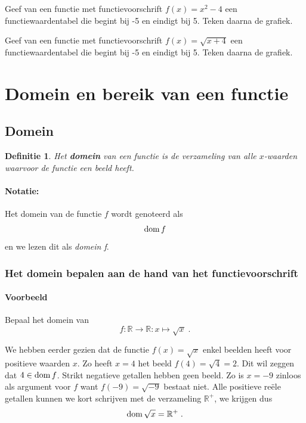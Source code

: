 \documentclass[12pt,twoside]{article}
\newtheorem{definition}{Definitie}
\begin{document}
\begin{oefening}
  Geef van een functie met functievoorschrift $f(x)=x^2-4$ een functiewaardentabel die begint bij -5 en eindigt bij 5. Teken daarna de grafiek.
\end{oefening}

\begin{oefening}
  Geef van een functie met functievoorschrift $f(x)=\sqrt{x+4}$ een functiewaardentabel die begint bij -5 en eindigt bij 5. Teken daarna de grafiek.
\end{oefening}


\newpage
\section{Domein en bereik van een functie}

\begin{theorie}
\subsection{Domein}

\begin{definition}
  Het {\bf domein} van een functie is de verzameling van alle $x$-waarden waarvoor de functie een beeld heeft.
\end{definition}

\paragraph{Notatie:} Het domein van de functie $f$ wordt genoteerd als $$\dom f$$ en we lezen dit als {\em domein f}.

\subsubsection{Het domein bepalen aan de hand van het functievoorschrift}

\paragraph{Voorbeeld} Bepaal het domein van $$f:\mathbb{R}\to\mathbb{R}:x\mapsto \sqrt{x}\;.$$

We hebben eerder gezien dat de functie $f(x)=\sqrt{x}$ enkel beelden heeft voor positieve waarden $x$. Zo heeft $x=4$ het beeld $f(4)=\sqrt{4}=2$. Dit wil zeggen dat $4\in\dom f$. Strikt negatieve getallen hebben geen beeld. Zo is $x=-9$ zinloos als argument voor $f$ want $f(-9)=\sqrt{-9}$ bestaat niet. Alle positieve reële getallen kunnen we kort schrijven met de verzameling $\mathbb{R}^+$, we krijgen dus
$$\dom \sqrt{x}= \mathbb{R}^+\;.$$


\end{theorie}
\end{document}
